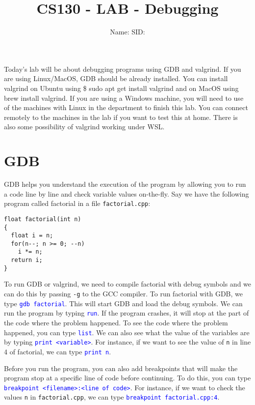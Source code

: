 \documentclass[12pt]{article}
\newcounter{problem}
\newcommand{\TODOL}[1]{\textcolor{red}{\underline{\hspace{#1 cm}}}}
\begin{document}
\title{CS130 - LAB - Debugging}
\date{}
\author{Name: \TODOL7\qquad\qquad SID: \TODOL4}
\maketitle
\begin{center}
\end{center}

\newcommand{\CM}[1]{\textcolor{blue}{\texttt{#1}}}

Today's lab will be about debugging programs using GDB and valgrind. If you are
using Linux/MacOS, GDB should be already installed. You can install valgrind on
Ubuntu using \$ sudo apt get install valgrind and on MacOS using brew install
valgrind. If you are using a Windows machine, you will need to use of the
machines with Linux in the department to finish this lab.  You can connect
remotely to the machines in the lab if you want to test this at home.  There is
also some possibility of valgrind working under WSL.

\section{GDB}

GDB helps you understand the execution of the program by allowing you to run a
code line by line and check variable values on-the-fly. Say we have the
following program called factorial in a file \texttt{factorial.cpp}:

\begin{lstlisting}
float factorial(int n)
{
  float i = n;
  for(n--; n >= 0; --n)
    i *= n;
  return i;
}
\end{lstlisting}

To run GDB or valgrind, we need to compile factorial with debug symbols and we
can do this by passing \texttt{-g} to the GCC compiler.  To run factorial with
GDB, we type \CM{gdb factorial}.  This will start GDB and load the debug symbols. We
can run the program by typing \CM{run}. If the program crashes, it will stop at the
part of the code where the problem happened. To see the code where the problem
happened, you can type \CM{list}. We can also see what the value of the variables are
by typing \CM{print <variable>}.  For instance, if we want to see the value
of \texttt{n} in line 4 of factorial, we can type \CM{print n}.

Before you run the program, you can also add breakpoints that will make the
program stop at a specific line of code before continuing.  To do this, you can
type \CM{breakpoint <filename>:<line of code>}. For instance, if we
want to check the values \texttt{n} in \texttt{factorial.cpp}, we can type
\CM{breakpoint factorial.cpp:4}.
\end{document}
